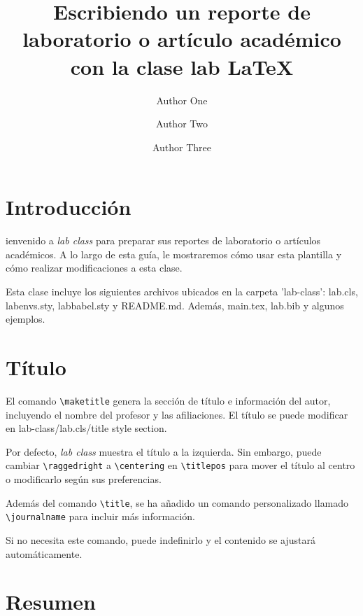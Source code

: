 \documentclass[9pt,a4paper,twocolumn,twoside]{lab-class/lab}
\title{Escribiendo un reporte de laboratorio o artículo académico con la clase lab \LaTeX}
\author[a,1]{Author One}
\author[b,2]{Author Two}
\author[b,c,3]{Author Three}
\affil[a]{Affiliation of author one}
\affil[b]{Affiliation of author two}
\affil[c]{Affiliation of author three}
\begin{document}
    \maketitle 
    \thispagestyle{firststyle} 
    \lababstract 
    

\section{Introducción}

    ienvenido a \textit{lab class} para preparar sus reportes de laboratorio o artículos académicos. A lo largo de esta guía, le mostraremos cómo usar esta plantilla y cómo realizar modificaciones a esta clase.
    
    Esta clase incluye los siguientes archivos ubicados en la carpeta 'lab-class': lab.cls, labenvs.sty, labbabel.sty y README.md. Además, main.tex, lab.bib y algunos ejemplos.

\section{Título}

    El comando \verb*|\maketitle| genera la sección de título e información del autor, incluyendo el nombre del profesor y las afiliaciones. El título se puede modificar en lab-class/lab.cls/title style section.
    
    Por defecto, \textit{lab class} muestra el título a la izquierda. Sin embargo, puede cambiar \verb*|\raggedright| a \verb*|\centering| en \verb*|\titlepos| para mover el título al centro o modificarlo según sus preferencias.
    
    Además del comando \verb|\title|, se ha añadido un comando personalizado llamado \verb|\journalname| para incluir más información.
    
    Si no necesita este comando, puede indefinirlo y el contenido se ajustará automáticamente.

\section{Resumen}
\end{document}
